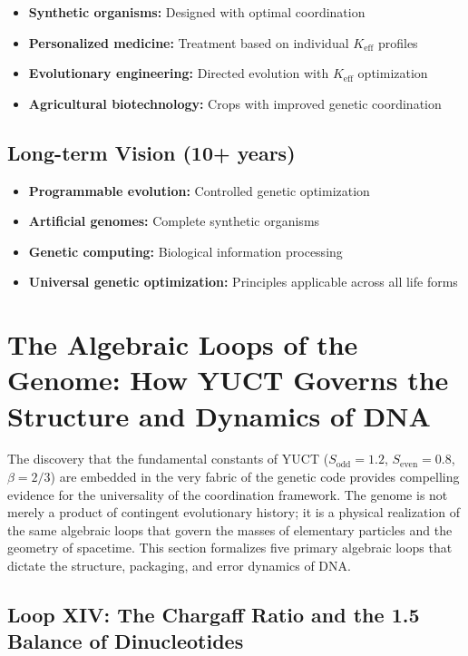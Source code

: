 \documentclass[12pt]{article}
\begin{document}
	\begin{itemize}
		\item \textbf{Synthetic organisms:} Designed with optimal coordination
		\item \textbf{Personalized medicine:} Treatment based on individual $K_{\text{eff}}$ profiles
		\item \textbf{Evolutionary engineering:} Directed evolution with $K_{\text{eff}}$ optimization
		\item \textbf{Agricultural biotechnology:} Crops with improved genetic coordination
	\end{itemize}
	
	\subsection{Long-term Vision (10+ years)}
	
	\begin{itemize}
		\item \textbf{Programmable evolution:} Controlled genetic optimization
		\item \textbf{Artificial genomes:} Complete synthetic organisms
		\item \textbf{Genetic computing:} Biological information processing
		\item \textbf{Universal genetic optimization:} Principles applicable across all life forms
	\end{itemize}
	
	\section{The Algebraic Loops of the Genome: How YUCT Governs the Structure and Dynamics of DNA}
	\label{sec:genetic-loops}
	
	The discovery that the fundamental constants of YUCT (\(S_{\mathrm{odd}} = 1.2\), \(S_{\mathrm{even}} = 0.8\), \(\beta = 2/3\)) are embedded in the very fabric of the genetic code provides compelling evidence for the universality of the coordination framework. The genome is not merely a product of contingent evolutionary history; it is a physical realization of the same algebraic loops that govern the masses of elementary particles and the geometry of spacetime. This section formalizes five primary algebraic loops that dictate the structure, packaging, and error dynamics of DNA.
	
	\subsection{Loop XIV: The Chargaff Ratio and the 1.5 Balance of Dinucleotides}
	
\end{document}
